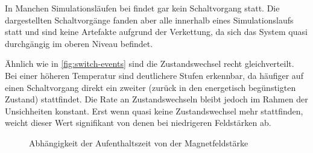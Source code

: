 \documentclass[main.tex]{subfiles}
\begin{document}
In Manchen Simulationsläufen bei  findet gar kein Schaltvorgang statt. Die dargestellten Schaltvorgänge fanden aber alle innerhalb eines Simulationslaufs statt und sind keine Artefakte aufgrund der Verkettung, da sich das System quasi durchgängig im oberen Niveau befindet.

Ähnlich wie in \cref{fig:switch-events} sind die Zustandswechsel recht gleichverteilt. Bei einer höheren Temperatur sind deutlichere Stufen erkennbar, da häufiger auf einen Schaltvorgang direkt ein zweiter (zurück in den energetisch begünstigten Zustand) stattfindet. Die Rate an Zustandswechseln bleibt jedoch im Rahmen der Unsichheiten konstant. Erst wenn quasi keine Zustandswechsel mehr stattfinden, weicht dieser Wert signifikant von denen bei niedrigeren Feldstärken ab. 

\begin{figure}[H]
    \centering
    \caption{Abhängigkeit der Aufenthaltszeit von der Magnetfeldstärke}\label{fig:bc-state-times}
\end{figure}
\end{document}
